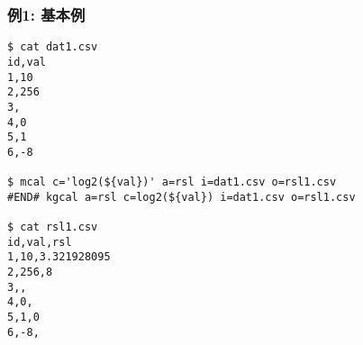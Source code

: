
\subsubsection*{例1: 基本例}


\begin{Verbatim}[baselinestretch=0.7,frame=single]
$ cat dat1.csv
id,val
1,10
2,256
3,
4,0
5,1
6,-8

$ mcal c='log2(${val})' a=rsl i=dat1.csv o=rsl1.csv
#END# kgcal a=rsl c=log2(${val}) i=dat1.csv o=rsl1.csv

$ cat rsl1.csv
id,val,rsl
1,10,3.321928095
2,256,8
3,,
4,0,
5,1,0
6,-8,
\end{Verbatim}

